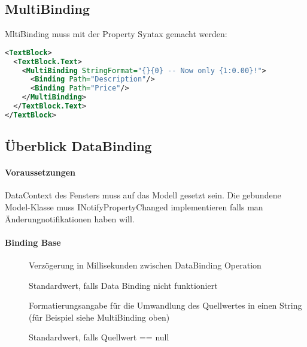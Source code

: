 \subsection{MultiBinding}
MltiBinding muss mit der Property Syntax gemacht werden:
\begin{lstlisting}[language=xml]
<TextBlock>
  <TextBlock.Text>
    <MultiBinding StringFormat="{}{0} -- Now only {1:0.00}!">
      <Binding Path="Description"/>
      <Binding Path="Price"/>
    </MultiBinding>
  </TextBlock.Text>
</TextBlock> 
\end{lstlisting}


\subsection{Überblick DataBinding}
\paragraph{Voraussetzungen} 
DataContext des Fensters muss auf das Modell gesetzt sein. Die gebundene Model-Klasse muss INotifyPropertyChanged implementieren falls man Änderungnotifikationen haben will.
\paragraph{Binding Base}
\begin{description}
\item[] Verzögerung in Millisekunden zwischen DataBinding Operation
\item[] Standardwert, falls Data Binding nicht funktioniert
\item[] Formatierungsangabe für die Umwandlung des Quellwertes in einen String  (für Beispiel siehe MultiBinding oben)
\item[] Standardwert, falls Quellwert == null
\end{description}
